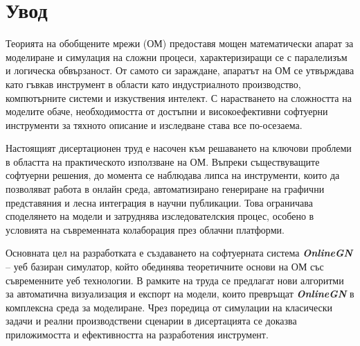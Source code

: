 \clearpage
{}
{}

\section*{Увод}

\hspace*{2.5em}Теорията на обобщените мрежи (ОМ) предоставя мощен математически апарат за моделиране и симулация на сложни процеси, характеризиращи се с паралелизъм и логическа обвързаност. От самото си зараждане, апаратът на ОМ се утвърждава като гъвкав инструмент в области като индустриалното производство, компютърните системи и изкуствения интелект. С нарастването на сложността на моделите обаче, необходимостта от достъпни и високоефективни софтуерни инструменти за тяхното описание и изследване става все по-осезаема.

Настоящият дисертационен труд е насочен към решаването на ключови проблеми в областта на практическото използване на ОМ. Въпреки съществуващите софтуерни решения, до момента се наблюдава липса на инструменти, които да позволяват работа в онлайн среда, автоматизирано генериране на графични представяния и лесна интеграция в научни публикации. Това ограничава споделянето на модели и затруднява изследователския процес, особено в условията на съвременната колаборация през облачни платформи.

Основната цел на разработката е създаването на софтуерната система \textbf{\textit{OnlineGN}} -- уеб базиран симулатор, който обединява теоретичните основи на ОМ със съвременните уеб технологии. В рамките на труда се предлагат нови алгоритми за автоматична визуализация и експорт на модели, които превръщат \textbf{\textit{OnlineGN}} в комплексна среда за моделиране. Чрез поредица от симулации на класически задачи и реални производствени сценарии в дисертацията се доказва приложимостта и ефективността на разработения инструмент.